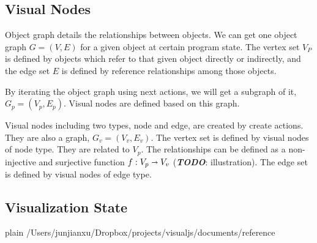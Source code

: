 \documentclass [a4paper,11pt,fleqn]{article}
\begin{document}
\subsection {Visual Nodes}
Object graph details the relationships between objects. We can get one object graph \(G = (V, E)\) for a given object at certain program state. The vertex set $V_P$ is defined by objects which refer to that given object directly or indirectly, and the edge set $E$ is defined by reference relationships among those objects.

By iterating the object graph using next actions, we will get a subgraph of it, \(G_p = (V_p, E_p)\). Visual nodes are defined based on this graph. 

Visual nodes including two types, node and edge, are created by create actions. They are also a graph, \(G_v = (V_v, E_v)\). The vertex set is defined by visual nodes of node type. They are related to $V_p$. The relationships can be defined as a non-injective and surjective function \(f:V_p\shortrightarrow V_v\) (\textbf{\textit{TODO}}: illustration). The edge set is defined by visual nodes of edge type.

\subsection {Visualization State}

\newpage
 {plain}
 {/Users/junjianxu/Dropbox/projects/visualjs/documents/reference}
\end{document}
